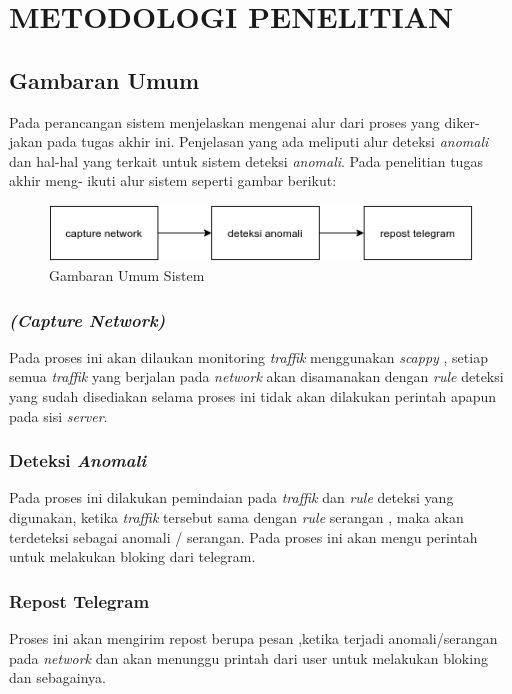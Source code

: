 
\chapter{METODOLOGI PENELITIAN}

\section{Gambaran Umum}
Pada perancangan sistem menjelaskan mengenai alur dari proses yang diker-
jakan pada tugas akhir ini. Penjelasan yang ada meliputi alur deteksi \emph{anomali} dan
hal-hal yang terkait untuk sistem deteksi \emph{anomali}. Pada penelitian tugas akhir meng-
ikuti alur sistem seperti gambar berikut:


\begin{figure}[H]
	\centering
	\includegraphics{gambar/gambaranUmum}
	\caption{Gambaran Umum Sistem}
	\label{Gambaran Umum Sistem}
\end{figure}

	\subsection{\emph{(Capture Network)}}
		Pada proses ini akan dilaukan monitoring \emph{traffik} menggunakan \emph{scappy} , setiap semua \emph{traffik} yang berjalan pada \emph{network} akan disamanakan dengan \emph{rule} deteksi yang sudah disediakan selama proses ini tidak akan dilakukan perintah apapun pada sisi \emph{server}. 
	\subsection{Deteksi \emph{Anomali}}
		Pada proses ini dilakukan pemindaian pada \emph{traffik} dan \emph{rule} deteksi yang digunakan, ketika \emph{traffik} tersebut sama dengan \emph{rule} serangan , maka akan terdeteksi sebagai anomali / serangan. Pada proses ini akan mengu perintah untuk melakukan bloking dari telegram.
		
	\subsection{Repost Telegram}
		Proses ini akan mengirim repost berupa pesan ,ketika terjadi anomali/serangan pada \emph{network} dan akan menunggu printah dari user untuk melakukan bloking dan sebagainya.
		
